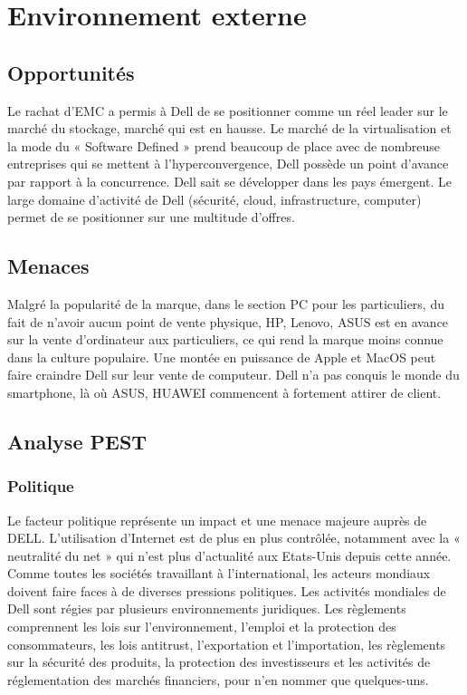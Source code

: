 \documentclass{bredele} %
\begin{document}
            \section{Environnement externe}
                \subsection*{Opportunités}
                Le rachat d’EMC a permis à Dell de se positionner comme un réel leader sur le marché du stockage, marché qui est en hausse. Le marché de la virtualisation et la mode du « Software Defined » prend beaucoup de place avec de nombreuse entreprises qui se mettent à l’hyperconvergence, Dell possède un point d’avance par rapport à la concurrence.
    \newline
    Dell sait se développer dans les pays émergent.
    \newline
    Le large domaine d’activité de Dell (sécurité, cloud, infrastructure, computer) permet de se positionner sur une multitude d’offres.
                \subsection*{Menaces}
                Malgré la popularité de la marque, dans le section PC pour les particuliers, du fait de n’avoir aucun point de vente physique, HP, Lenovo, ASUS est en avance sur la vente d’ordinateur aux particuliers, ce qui rend la marque moins connue dans la culture populaire.
    \newline
    Une montée en puissance de Apple et MacOS peut faire craindre Dell sur leur vente de computeur.
    \newline
    Dell n’a pas conquis le monde du smartphone, là où ASUS, HUAWEI commencent à fortement attirer de client.
                \subsection*{Analyse PEST}
                    \subsubsection*{Politique}
                    Le facteur politique représente un impact et une menace majeure auprès de DELL. L’utilisation d’Internet est de plus en plus contrôlée, notamment avec la « neutralité du net » qui n’est plus d’actualité aux Etats-Unis depuis cette année. Comme toutes les sociétés travaillant à l’international, les acteurs mondiaux doivent faire faces à de diverses pressions politiques.
    \newline
    Les activités mondiales de Dell sont régies par plusieurs environnements juridiques. Les règlements comprennent les lois sur l'environnement, l'emploi et la protection des consommateurs, les lois antitrust, l'exportation et l'importation, les règlements sur la sécurité des produits, la protection des investisseurs et les activités de réglementation des marchés financiers, pour n'en nommer que quelques-uns.
\end{document}
